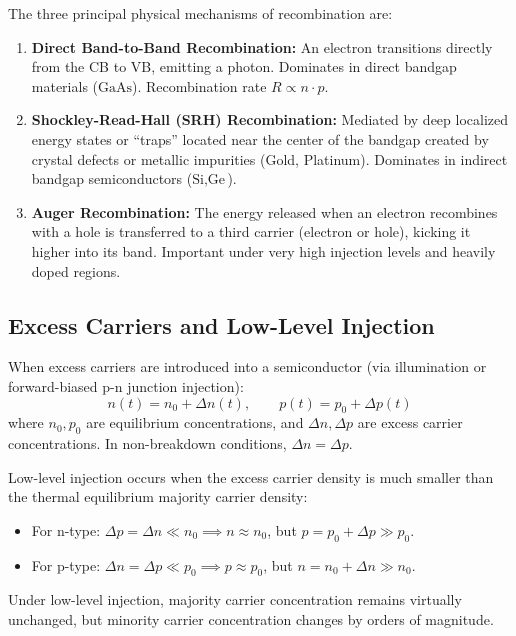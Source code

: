\documentclass[12pt,a4paper]{article}
\begin{document}
The three principal physical mechanisms of recombination are:
\begin{enumerate}[label=\arabic*., leftmargin=*]
  \item \textbf{Direct Band-to-Band Recombination:} An electron transitions directly from the CB to VB, emitting a photon. Dominates in direct bandgap materials ($\text{GaAs}$). Recombination rate $R \propto n \cdot p$.
  \item \textbf{Shockley-Read-Hall (SRH) Recombination:} Mediated by deep localized energy states or ``traps'' located near the center of the bandgap created by crystal defects or metallic impurities (Gold, Platinum). Dominates in indirect bandgap semiconductors ($\text{Si}, \text{Ge}$).
  \item \textbf{Auger Recombination:} The energy released when an electron recombines with a hole is transferred to a third carrier (electron or hole), kicking it higher into its band. Important under very high injection levels and heavily doped regions.
\end{enumerate}

\subsection{Excess Carriers and Low-Level Injection}
When excess carriers are introduced into a semiconductor (via illumination or forward-biased p-n junction injection):
\begin{equation}
  n(t) = n_0 + \Delta n(t), \qquad p(t) = p_0 + \Delta p(t)
\end{equation}
where $n_0, p_0$ are equilibrium concentrations, and $\Delta n, \Delta p$ are excess carrier concentrations. In non-breakdown conditions, $\Delta n = \Delta p$.

\begin{tcolorbox}[defbox, title={\textbf{Low-Level Injection Condition}}]
Low-level injection occurs when the excess carrier density is much smaller than the thermal equilibrium majority carrier density:
\begin{itemize}[leftmargin=*, itemsep=2pt, topsep=0pt]
  \item For n-type: $\Delta p = \Delta n \ll n_0 \implies n \approx n_0$, but $p = p_0 + \Delta p \gg p_0$.
  \item For p-type: $\Delta n = \Delta p \ll p_0 \implies p \approx p_0$, but $n = n_0 + \Delta n \gg n_0$.
\end{itemize}
Under low-level injection, majority carrier concentration remains virtually unchanged, but minority carrier concentration changes by orders of magnitude.
\end{tcolorbox}
\end{document}
